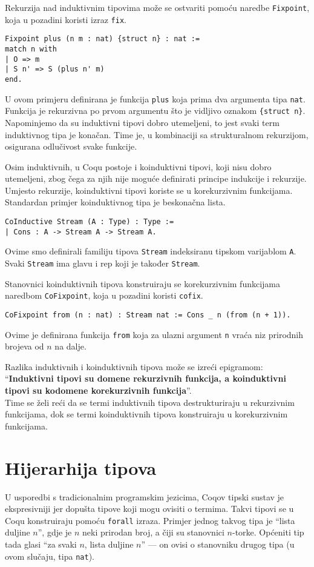 Rekurzija nad induktivnim tipovima može se ostvariti pomoću naredbe \texttt{Fixpoint}, koja u pozadini koristi izraz \texttt{fix}.
\begin{verbatim}
Fixpoint plus (n m : nat) {struct n} : nat :=
match n with
| O => m
| S n' => S (plus n' m)
end.
\end{verbatim}
U ovom primjeru definirana je funkcija \texttt{plus} koja prima dva argumenta tipa \texttt{nat}.
Funkcija je rekurzivna po prvom argumentu što je vidljivo oznakom \texttt{\{struct n\}}.
Napominjemo da su induktivni tipovi dobro utemeljeni, to jest svaki term induktivnog tipa je konačan.
Time je, u kombinaciji sa strukturalnom rekurzijom, osigurana odlučivost svake funkcije.

Osim induktivnih, u Coqu postoje i koinduktivni tipovi, koji nisu dobro utemeljeni,
zbog čega za njih nije moguće definirati principe indukcije i rekurzije.
Umjesto rekurzije, koinduktivni tipovi koriste se u korekurzivnim funkcijama.
Standardan primjer koinduktivnog tipa je beskonačna lista.
\begin{verbatim}
CoInductive Stream (A : Type) : Type :=
| Cons : A -> Stream A -> Stream A.
\end{verbatim}
Ovime smo definirali familiju tipova \texttt{Stream} indeksiranu tipskom varijablom \texttt{A}.
Svaki \texttt{Stream} ima glavu i rep koji je također \texttt{Stream}.

Stanovnici koinduktivnih tipova konstruiraju se korekurzivnim funkcijama naredbom \texttt{CoFixpoint}, koja u pozadini koristi \texttt{cofix}.
\begin{verbatim}
CoFixpoint from (n : nat) : Stream nat := Cons _ n (from (n + 1)).
\end{verbatim}
Ovime je definirana funkcija \texttt{from} koja za ulazni argument \texttt{n} vraća niz prirodnih brojeva od \(n\) na dalje.

Razlika induktivnih i koinduktivnih tipova može se izreći epigramom:\\
``\textbf{Induktivni tipovi su domene rekurzivnih funkcija, a koinduktivni tipovi su kodomene korekurzivnih funkcija}''.\\
Time se želi reći da se termi induktivnih tipova destrukturiraju u rekurzivnim funkcijama,
dok se termi koinduktivnih tipova konstruiraju u korekurzivnim funkcijama.


\section{Hijerarhija tipova}\label{sec:kumul-hijer-tipova}
U usporedbi s tradicionalnim programskim jezicima, Coqov tipski sustav je ekspresivniji jer dopušta tipove koji mogu ovisiti o termima.
Takvi tipovi se u Coqu konstruiraju pomoću \texttt{forall} izraza.
Primjer jednog takvog tipa je ``lista duljine \(n\)'', gdje je \(n\) neki prirodan broj, a čiji su stanovnici \(n\)-torke.
Općeniti tip tada glasi ``za svaki \(n\), lista duljine \(n\)'' --- on ovisi o stanovniku drugog tipa (u ovom slučaju, tipa \texttt{nat}).

